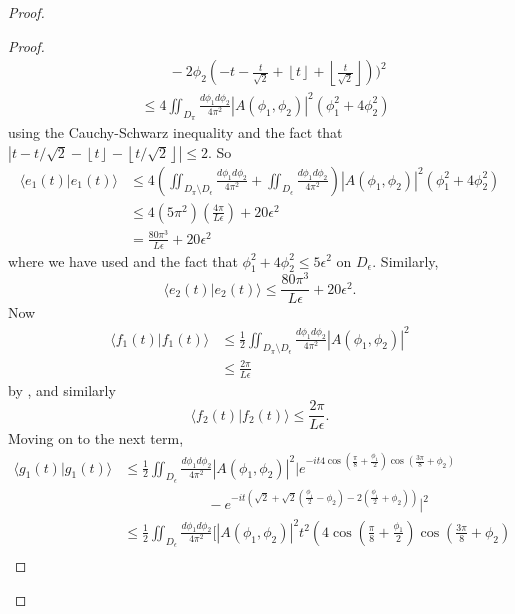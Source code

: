 \documentclass[../thesis-main/thesis-main]{subfiles}
\begin{document}
\begin{proof}
\begin{proof}
\begin{align*}
 &  \quad \quad -2\phi_{2}\left(-t-\frac{t}{\sqrt{2}}+\left\lfloor t\right\rfloor +\left\lfloor \frac{t}{\sqrt{2}}\right\rfloor \right)\Bigg)^{2}\\
 & \leq  4\iint_{D_{\pi}}\frac{d\phi_{1}d\phi_{2}}{4\pi^{2}}\left|A(\phi_{1},\phi_{2})\right|^{2}\left(\phi_{1}^{2}+4\phi_{2}^{2}\right)
\end{align*}
using the Cauchy-Schwarz inequality and the fact that $\left|t-{t}/{\sqrt{2}}-\left\lfloor t\right\rfloor -\left\lfloor {t}/{\sqrt{2}}\right\rfloor \right|\leq2$.
So 
\begin{align*}
\langle e_{1}(t)|e_{1}(t)\rangle & \leq 4\left(\iint_{D_{\pi}\setminus D_{\epsilon}}\frac{d\phi_{1}d\phi_{2}}{4\pi^{2}}+\iint_{D_{\epsilon}}\frac{d\phi_{1}d\phi_{2}}{4\pi^{2}}\right)\left|A(\phi_{1},\phi_{2})\right|^{2}\left(\phi_{1}^{2}+4\phi_{2}^{2}\right)\\
 & \leq  4\left(5\pi^{2}\right)\left(\frac{4\pi}{L\epsilon}\right)+20\epsilon^{2}\\
 & =  \frac{80\pi^{3}}{L\epsilon}+20\epsilon^{2}
\end{align*}
where we have used  and the fact that $\phi_{1}^{2}+4\phi_{2}^{2}\leq 5\epsilon^{2}$ on $D_\epsilon$. Similarly, 
\[
\langle e_{2}(t)|e_{2}(t)\rangle\leq\frac{80\pi^{3}}{L\epsilon}+20\epsilon^{2}.
\]
 Now
 \begin{align*}
\langle f_{1}(t)|f_{1}(t)\rangle & \leq  \frac{1}{2}\iint_{D_{\pi}\setminus D_{\epsilon}}\frac{d\phi_{1}d\phi_{2}}{4\pi^{2}}\left|A(\phi_{1},\phi_{2})\right|^{2}\\
 & \leq  \frac{2\pi}{L\epsilon}
 \end{align*}
 by , and similarly
 \[
\langle f_{2}(t)|f_{2}(t)\rangle\leq\frac{2\pi}{L\epsilon}.
\]
Moving on to the next term, 
\begin{align}
\langle g_{1}(t)|g_{1}(t)\rangle & \leq  \frac{1}{2}\iint_{D_{\epsilon}}\frac{d\phi_{1}d\phi_{2}}{4\pi^{2}}
	\left|A(\phi_{1},\phi_{2})\right|^{2}\Bigg|e^{-it 4\cos(\frac{\pi}{8}+\frac{\phi_{1}}{2})
	\cos(\frac{3\pi}{8}+\phi_{2})}\nonumber \\
 &  \qquad\qquad\qquad -e^{-it\left(\sqrt{2}+\sqrt{2}\left(\frac{\phi_{1}}{2}-\phi_{2}\right)-2\left(\frac{\phi_{1}}{2}+\phi_{2}\right)\right)}
 	\Bigg|^{2}\nonumber \\
 & \leq  \frac{1}{2}\iint_{D_{\epsilon}}\frac{d\phi_{1}d\phi_{2}}{4\pi^{2}}
 	\Bigg[\left|A(\phi_{1},\phi_{2})\right|^{2}t^{2} \left(4\cos\left(\frac{\pi}{8}+\frac{\phi_{1}}{2}\right)\cos\left(\frac{3\pi}{8}+\phi_{2}\right)\right.\nonumber\\

\end{align}
\end{proof}
\end{proof}
\end{document}
